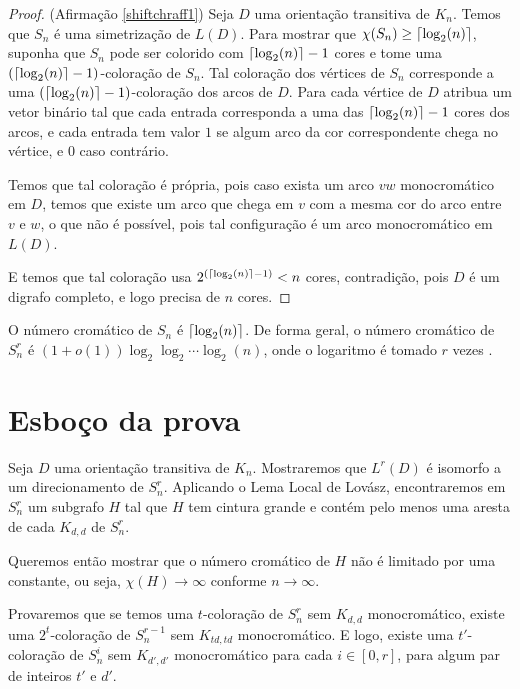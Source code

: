 \begin{proof}(Afirmação \ref{shiftchraff1})
Seja $D$ uma orientação transitiva de $K_n$. Temos que $S_n$ é uma simetrização de $L(D)$. Para mostrar que $\chi(S_n) \geq \lceil\log_2(n)\rceil$, suponha que $S_n$ pode ser colorido com $\lceil\log_2(n)\rceil - 1$ cores e tome uma $(\lceil\log_2(n)\rceil -1)$-coloração de $S_n$. Tal coloração dos vértices de $S_n$ corresponde a uma $(\lceil\log_2(n)\rceil-1)$-coloração dos arcos de $D$. Para cada vértice de $D$ atribua um vetor binário tal que cada entrada corresponda a uma das $\lceil\log_2(n)\rceil-1$ cores dos arcos, e cada entrada tem valor $1$ se algum arco da cor correspondente chega no vértice, e $0$ caso contrário. 

Temos que tal coloração é própria, pois caso exista um arco $vw$ monocromático em $D$, temos que existe um arco que chega em $v$ com a mesma cor do arco entre $v$ e $w$, o que não é possível, pois tal configuração é um arco monocromático em $L(D)$. 

E temos que tal coloração usa $2^{(\lceil\log_2(n)\rceil-1)} < n$ cores, contradição, pois $D$ é um digrafo completo, e logo precisa de $n$ cores.
\end{proof}

O número cromático de $S_n$ é $\lceil\log_2(n)\rceil$. De forma geral, o número cromático de $S_n^r$ é $(1+o(1))\log_2 \log_2 \cdots \log_2 (n)$, onde o logaritmo é tomado $r$ vezes \cite{erdos1968chromatic}.


\section{Esboço da prova}

Seja $D$ uma orientação transitiva de $K_n$. Mostraremos que $L^r(D)$ é isomorfo a um direcionamento de $S_n^r$. Aplicando o Lema Local de Lovász, encontraremos em $S_n^r$ um subgrafo $H$ tal que $H$ tem cintura grande e contém pelo menos uma aresta de cada $K_{d,d}$ de $S_n^r$.

Queremos então mostrar que o número cromático de $H$ não é limitado por uma constante, ou seja, $\chi(H) \rightarrow \infty$ conforme $n \rightarrow \infty$.

Provaremos que se temos uma $t$-coloração de $S_n^r$ sem $K_{d,d}$ monocromático, existe uma $2^t$-coloração de $S_n^{r-1}$ sem $K_{td,td}$ monocromático. E logo, existe uma $t'$-coloração de $S_n^i$ sem $K_{d',d'}$ monocromático para cada $i\in [0,r]$, para algum par de inteiros $t'$ e $d'$.

